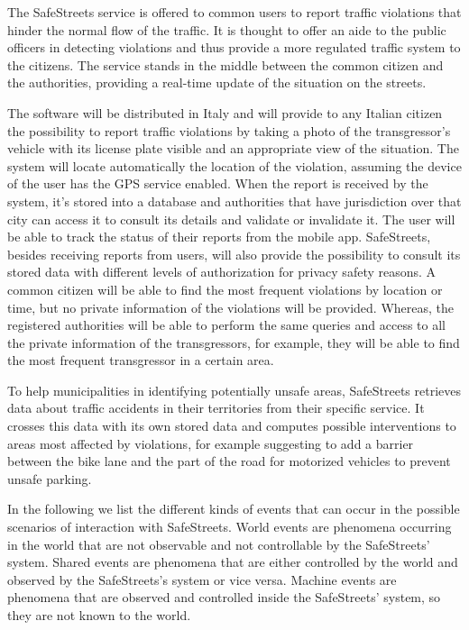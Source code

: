 The SafeStreets service is offered to common users to report traffic violations that hinder the normal flow of the traffic. It is thought to offer an aide to the public officers in detecting violations and thus provide a more regulated traffic system to the citizens. The service stands in the middle between the common citizen and the authorities, providing a real-time update of the situation on the streets.

The software will be distributed in Italy and will provide to any Italian citizen the possibility to report traffic violations by taking a photo of the transgressor's vehicle with its license plate visible and an appropriate view of the situation. The system will locate automatically the location of the violation, assuming the device of the user has the GPS service enabled. When the report is received by the system, it's stored into a database and authorities that have jurisdiction over that city can access it to consult its details and validate or invalidate it. The user will be able to track the status of their reports from the mobile app. SafeStreets, besides receiving reports from users, will also provide the possibility to consult its stored data with different levels of authorization for privacy safety reasons. A common citizen will be able to find the most frequent violations by location or time, but no private information of the violations will be provided. Whereas, the registered authorities will be able to perform the same queries and access to all the private information of the transgressors, for example, they will be able to find the most frequent transgressor in a certain area.

To help municipalities in identifying potentially unsafe areas, SafeStreets retrieves data about traffic accidents in their territories from their specific service. It crosses this data with its own stored data and computes possible interventions to areas most affected by violations, for example suggesting to add a barrier between the bike lane and the part of the road for motorized vehicles to prevent unsafe parking.

In the following we list the different kinds of events that can occur in the possible scenarios of interaction with SafeStreets. World events are phenomena occurring in the world that are not observable and not controllable by the SafeStreets' system. Shared events are phenomena that are either controlled by the world and observed by the SafeStreets's system or vice versa. Machine events are phenomena that are observed and controlled inside the SafeStreets' system, so they are not known to the world.

